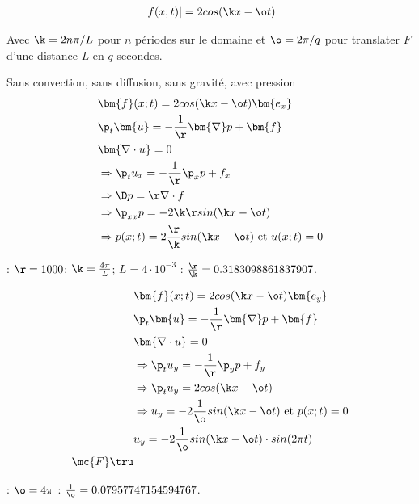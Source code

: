 

\begin{align}
| f(x;t) | = 2 cos(\k x - \o t)
\end{align}

Avec $\k = 2 n \pi / L$ pour $n$ périodes sur le domaine et $\o = 2 \pi / q$  pour translater $F$ d'une distance $L$ en $q$ secondes.

{\color{red} Sans convection, sans diffusion, sans gravité, avec pression}
\begin{align}
 &\bm{f}(x;t)  = 2 cos(\k x - \o t) \bm{e_x} \\
 &\p_t \bm{u} = - \frac{1}{\r} \bm{\nabla} p + \bm{f} \\
  &\bm{ \nabla \cdot u } = 0 \\
 &\Rightarrow \p_t u_x = - \frac{1}{\r} \p_x p + f_x \\
 &\Rightarrow \D p = \r \nabla \cdot f \\
 &\Rightarrow \p_{xx} p = - 2 \k \r sin(\k x - \o t) \\
 &\Rightarrow p(x;t) = 2 \frac{\r}{\k} sin(\k x - \o t) \text{ et } u(x;t) = 0 
\end{align}

 : $\r = 1000$; $\k = \frac{4 \pi}{L}$; $L = 4 \cdot 10^{-3}$ : $\frac{\r}{\k} = 0.3183098861837907$.
 
\begin{align}
&\bm{f}(x;t) = 2 cos(\k x - \o t) \bm{e_y} \\
 &\p_t \bm{u} = - \frac{1}{\r} \bm{\nabla} p + \bm{f} \\
 &\bm{ \nabla \cdot u } = 0 \\
 &\Rightarrow  \p_t u_y = - \frac{1}{\r} \p_y p + f_y \\
 &\Rightarrow \p_t u_y = 2 cos(\k x - \o t) \\
 &\Rightarrow u_y = - 2 \frac{1}{\o} sin(\k x - \o t) \text{ et } p(x;t) = 0 \\
 &u_y = - 2 \frac{1}{\o} sin(\k x - \o t)  \cdot sin(2 \pi t)\\
 \mc{F} \tru
\end{align}

 : $\o = 4 \pi$ : $\frac{1}{\o} = 0.07957747154594767$.
 
